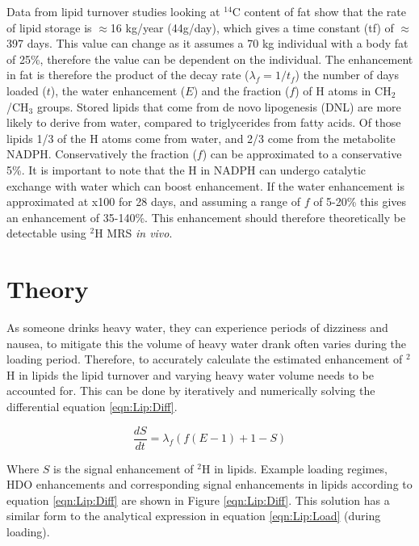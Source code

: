 \documentclass[class=article, crop=false]{standalone}
\begin{document}
Data from lipid turnover studies looking at $^{14}$C content of fat show that the rate of lipid storage is $\approx$16 kg/year (44g/day)\cite{Arner2011DynamicsDisease, Spalding2017ImpactTissue}, which gives a time constant (tf) of $\approx$397 days. This value can change as it assumes a 70 kg individual with a body fat of 25\%, therefore the value can be dependent on the individual. The enhancement in fat is therefore the product of the decay rate ($\lambda_f = 1/t_f$) the number of days loaded ($t$), the water enhancement ($E$) and the fraction ($f$) of H atoms in CH$_2$/CH$_3$ groups. Stored lipids that come from de novo lipogenesis (DNL) are more likely to derive from water, compared to triglycerides from fatty acids\cite{Strawford2004AdiposeO}. Of those lipids 1/3 of the H atoms come from water, and 2/3 come from the metabolite NADPH\cite{Zhang2017ChemicalNADPH}. Conservatively the fraction ($f$) can be approximated to a conservative 5\%. It is important to note that the H in NADPH can undergo catalytic exchange with water which can boost enhancement. If the water enhancement is approximated at x100 for 28 days, and assuming a range of $f$ of 5-20\% this gives an enhancement of 35-140\%. This enhancement should therefore theoretically be detectable using $^2$H MRS \textit{in vivo}\cite{Brereton1986PreliminarySpectroscopy}. 

\section{Theory}

As someone drinks heavy water, they can experience periods of dizziness and nausea\cite{Money1974HeavyAlcohol}, to mitigate this the volume of heavy water drank often varies during the loading period\cite{Strawford2004AdiposeO, Cocking2023DeuteriumDosing}. Therefore, to accurately calculate the estimated enhancement of $^2$H in lipids the lipid turnover and varying heavy water volume needs to be accounted for. This can be done by iteratively and numerically solving the differential equation \ref{eqn:Lip:Diff}.

\begin{equation}
    \frac{dS}{dt} = \lambda_f(f(E-1)+1-S)
    \label{eqn:Lip:Diff}
\end{equation}

Where $S$ is the signal enhancement of $^2$H in lipids. Example loading regimes, HDO enhancements and corresponding signal enhancements in lipids according to equation \ref{eqn:Lip:Diff} are shown in Figure \ref{eqn:Lip:Diff}. This solution has a similar form to the analytical expression in equation \ref{eqn:Lip:Load} (during loading).
\end{document}

